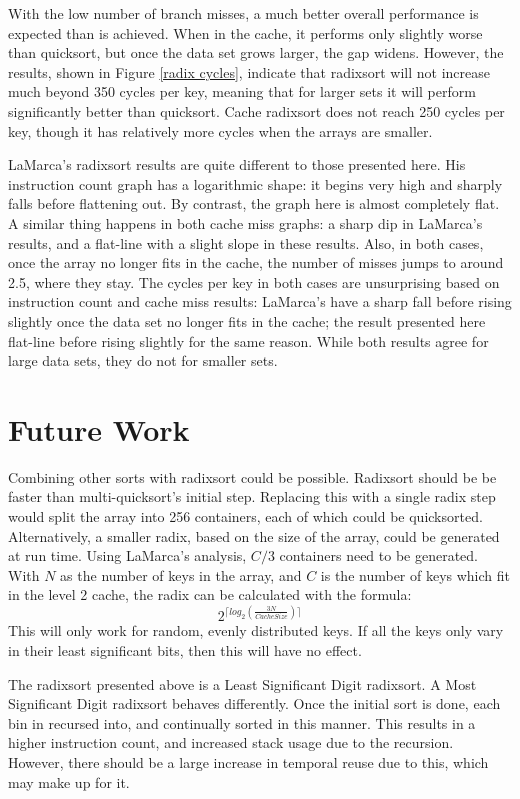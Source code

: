 With the low number of branch misses, a much better overall performance is
expected than is achieved. When in the cache, it performs only slightly worse
than quicksort, but once the data set grows larger, the gap widens.  However,
the results, shown in Figure \ref{radix cycles}, indicate that radixsort will
not increase much beyond 350 cycles per key, meaning that for larger sets it will
perform significantly better than quicksort. Cache radixsort does not reach 
250 cycles per key, though it has relatively more cycles when the arrays are
smaller. 

LaMarca's radixsort results are quite different to those presented here. His
instruction count graph has a logarithmic shape: it begins very high and sharply
falls before flattening out. By contrast, the graph here is almost completely
flat. A similar thing happens in both cache miss graphs: a sharp dip in
LaMarca's results, and a flat-line with a slight slope in these results. Also,
in both cases, once the array no longer fits in the cache, the number of misses
jumps to around 2.5, where they stay. 
The cycles per key in both cases are unsurprising based on instruction count and
cache miss results: LaMarca's have a sharp fall before rising slightly once the
data set no longer fits in the cache; the result presented here flat-line before rising
slightly for the same reason. While both results agree for large data sets, they do not
for smaller sets.

\section{Future Work}
\label{radix future work}
Combining other sorts with radixsort could be possible.  Radixsort should be be
faster than multi-quicksort's initial step. Replacing this with a single radix
step would split the array into 256 containers, each of which could be
quicksorted. Alternatively, a smaller radix, based on the size of the array,
could be generated at run time. Using LaMarca's analysis, $C/3$ containers need
to be generated. With $N$ as the number of keys in the array, and $C$ is the
number of keys which fit in the level 2 cache, the radix can be calculated with
the formula:
$$2^{\lceil{}log_2(\frac{3N}{CacheSize})\rceil{}}$$
This will only work for random, evenly distributed keys. If all the keys only
vary in their least significant bits, then this will have no effect.

The radixsort presented above is a Least Significant Digit radixsort. A Most
Significant Digit radixsort behaves differently. Once the initial sort is done, each
bin in recursed into, and continually sorted in this manner. This results in a
higher instruction count, and increased stack usage due to the recursion.
However, there should be a large increase in temporal reuse due to this, which
may make up for it.
